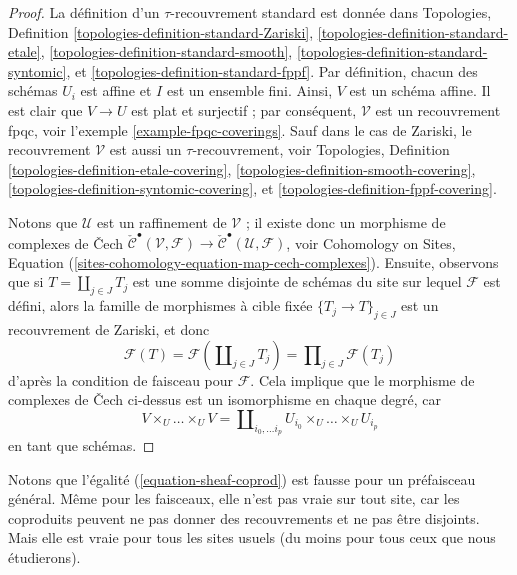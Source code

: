\begin{proof}
La d\'efinition d'un $\tau$-recouvrement standard est donn\'ee dans
Topologies, Definition
\ref{topologies-definition-standard-Zariski},
\ref{topologies-definition-standard-etale},
\ref{topologies-definition-standard-smooth},
\ref{topologies-definition-standard-syntomic}, et
\ref{topologies-definition-standard-fppf}.
Par d\'efinition, chacun des sch\'emas
$U_i$ est affine et $I$ est un ensemble fini. Ainsi, $V$ est un sch\'ema affine.
Il est clair que $V \to U$ est plat et surjectif ; par cons\'equent,
$\mathcal{V}$ est un recouvrement fpqc, voir
l'exemple \ref{example-fpqc-coverings}.
Sauf dans le cas de Zariski, le recouvrement $\mathcal{V}$
est aussi un $\tau$-recouvrement, voir
Topologies, Definition
\ref{topologies-definition-etale-covering},
\ref{topologies-definition-smooth-covering},
\ref{topologies-definition-syntomic-covering}, et
\ref{topologies-definition-fppf-covering}.

\medskip\noindent
Notons que $\mathcal{U}$ est un raffinement de $\mathcal{V}$ ;
il existe donc un morphisme de complexes de {\v C}ech
$\check{\mathcal{C}}^\bullet (\mathcal{V}, \mathcal{F}) \to
\check{\mathcal{C}}^\bullet (\mathcal{U}, \mathcal{F})$, voir
Cohomology on Sites,
Equation (\ref{sites-cohomology-equation-map-cech-complexes}).
Ensuite, observons que si $T = \coprod_{j \in J} T_j$ est une
somme disjointe de sch\'emas du site sur lequel $\mathcal{F}$ est d\'efini,
alors la famille de morphismes \`a cible fix\'ee
$\{T_j \to T\}_{j \in J}$ est un recouvrement de Zariski, et donc
\begin{equation}
\label{equation-sheaf-coprod}
\mathcal{F}(T) =
\mathcal{F}(\coprod\nolimits_{j \in J} T_j) =
\prod\nolimits_{j \in J} \mathcal{F}(T_j)
\end{equation}
d'apr\`es la condition de faisceau pour $\mathcal{F}$.
Cela implique que le morphisme de complexes de {\v C}ech ci-dessus est un isomorphisme
en chaque degr\'e, car
$$
V \times_U \ldots \times_U V
=
\coprod\nolimits_{i_0, \ldots i_p} U_{i_0} \times_U \ldots \times_U U_{i_p}
$$
en tant que sch\'emas.
\end{proof}

\noindent
Notons que l'\'egalit\'e (\ref{equation-sheaf-coprod})
est fausse pour un pr\'efaisceau g\'en\'eral. M\^eme pour les faisceaux, elle n'est pas vraie sur tout
site, car les coproduits peuvent ne pas donner des recouvrements et ne pas \^etre disjoints.
Mais elle est vraie pour tous les sites usuels (du moins pour tous ceux que nous \'etudierons).

